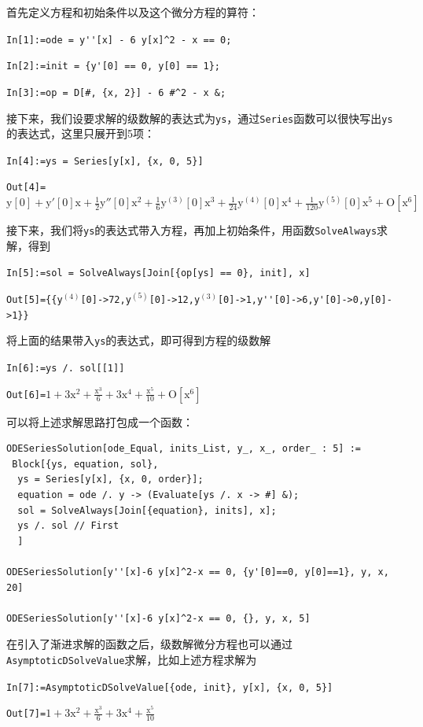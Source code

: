 \documentclass[UTF8,a4paper,10pt]{ctexart}
\begin{document}
首先定义方程和初始条件以及这个微分方程的算符：

\verb|In[1]:=ode = y''[x] - 6 y[x]^2 - x == 0;| 

\verb|In[2]:=init = {y'[0] == 0, y[0] == 1};|

\verb|In[3]:=op = D[#, {x, 2}] - 6 #^2 - x &;|   

接下来，我们设要求解的级数解的表达式为\verb|ys|，通过\verb|Series|函数可以很快写出\verb|ys|的表达式，这里只展开到5项：

\verb|In[4]:=ys = Series[y[x], {x, 0, 5}]|

\verb|Out[4]=|$\text{y}[0]+ \text{y}'[0]\text{x}+\frac{1}{2}  \text{y}''[0]\text{x}^2+\frac{1}{6}  \text{y}^{(3)}[0]\text{x}^3+\frac{1}{24} 
   \text{y}^{(4)}[0]\text{x}^4+\frac{1}{120}  \text{y}^{(5)}[0]\text{x}^5+\text{O}[\text{x}^6]$

接下来，我们将\verb|ys|的表达式带入方程，再加上初始条件，用函数\verb|SolveAlways|求解，得到

\verb|In[5]:=sol = SolveAlways[Join[{op[ys] == 0}, init], x]|

\verb|Out[5]={{y|$^{(4)}$\verb|[0]->72,y|$^{(5)}$\verb|[0]->12,y|$^{(3)}$\verb|[0]->1,y''[0]->6,y'[0]->0,y[0]->1}}|

将上面的结果带入\verb|ys|的表达式，即可得到方程的级数解

\verb|In[6]:=ys /. sol[[1]]|

\verb|Out[6]=|$1+3 \text{x}^2+\frac{\text{x}^3}{6}+3 \text{x}^4+\frac{\text{x}^5}{10}+\text{O}[\text{x}^6]$

可以将上述求解思路打包成一个函数：
\begin{lstlisting}
ODESeriesSolution[ode_Equal, inits_List, y_, x_, order_ : 5] := 
 Block[{ys, equation, sol},
  ys = Series[y[x], {x, 0, order}];
  equation = ode /. y -> (Evaluate[ys /. x -> #] &);
  sol = SolveAlways[Join[{equation}, inits], x];
  ys /. sol // First
  ]

ODESeriesSolution[y''[x]-6 y[x]^2-x == 0, {y'[0]==0, y[0]==1}, y, x, 20]

ODESeriesSolution[y''[x]-6 y[x]^2-x == 0, {}, y, x, 5]
\end{lstlisting}

在引入了渐进求解的函数之后，级数解微分方程也可以通过\verb|AsymptoticDSolveValue|求解，比如上述方程求解为

\verb|In[7]:=AsymptoticDSolveValue[{ode, init}, y[x], {x, 0, 5}]|

\verb|Out[7]=|$1+3 \text{x}^2+\frac{\text{x}^3}{6}+3 \text{x}^4+\frac{\text{x}^5}{10}$
\end{document}

